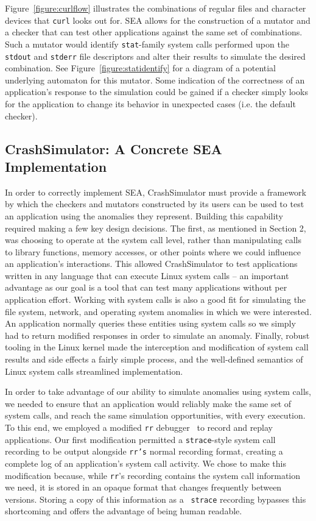 Figure~\ref{figure:curlflow} illustrates the combinations of regular files and character devices
that {\tt curl} looks out for.  SEA allows for the construction of a mutator and
a checker that can test other applications against the same set of
combinations.  Such a mutator would identify {\tt stat}-family system calls
performed upon the {\tt stdout} and {\tt stderr} file descriptors and alter
their results to simulate the desired combination.
See Figure~\ref{figure:statidentify}
for a diagram of a potential underlying automaton for this mutator.
Some indication of the
correctness of an application's response to the simulation could be gained
if a checker simply looks for the application to change its behavior in
unexpected cases (i.e. the default checker).


\subsection{CrashSimulator: A Concrete SEA Implementation}
\label{SUBSEC:ApproachCrashSim}

In order to correctly implement SEA, CrashSimulator
must provide a framework
by which the checkers and mutators
constructed by its users can be used to
test an application using the anomalies they represent.
Building this capability
required making a few key design decisions. The first, as mentioned in
Section 2, was choosing to operate at the system call level, rather than
manipulating calls to library functions, memory accesses, or other points
where we could influence an application's interactions.
This allowed CrashSimulator
to test applications written in any
language that can execute Linux system
calls -- an important advantage as our
goal is a tool that can test many
applications without per application
effort.
Working with system calls is also a good fit
for simulating the file system,
network, and operating system anomalies in which we were interested.
An application normally queries these entities using system calls
so we simply had to return modified responses in order to simulate an
anomaly.
Finally, robust tooling in the Linux kernel made the
interception and modification of system call results and side effects a
fairly simple process,  and the well-defined semantics of Linux
system calls streamlined implementation.


In order to take advantage of our ability to simulate anomalies using
system calls, we needed to ensure that an application would reliably make
the same set of
system calls, and reach the same simulation opportunities,
with every execution.
To this end,
we employed a modified
{\tt rr} debugger~\cite{rrwebsite} to record and replay applications. Our
first modification permitted a {\tt strace}-style system call recording
to be output alongside {\tt rr's} normal recording format,
creating a complete log of an application’s system call activity.
We chose to make this
modification because, while {\tt rr}'s recording contains the system call
information we need, it is stored in an opaque format that changes
frequently between versions.  Storing a copy of this information as a {\tt
strace} recording bypasses this shortcoming and offers the advantage of
being human readable.

